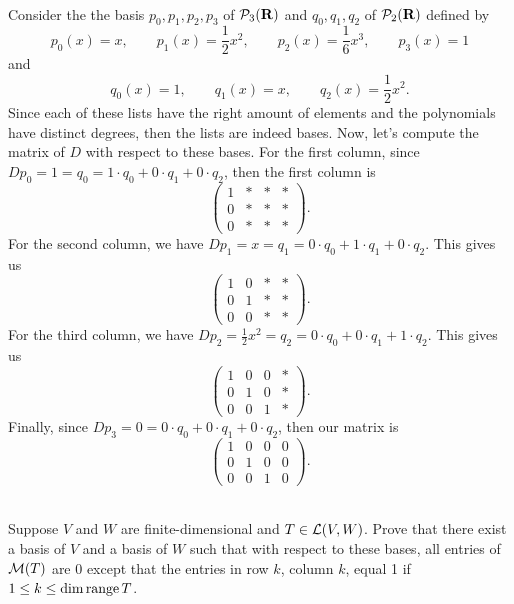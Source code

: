 \begin{solution}
    \\ Consider the the basis $p_0, p_1, p_2, p_3$ of $\mathcal{P}_3(\mathbf{R})$ and $q_0, q_1, q_2$ of $\mathcal{P}_2(\mathbf{R})$ defined by 
    $$p_0(x) = x, \qquad p_1(x) = \frac{1}{2}x^2, \qquad p_2(x) = \frac{1}{6}x^3, \qquad p_3(x) = 1$$
    and
    $$q_0(x) = 1, \qquad q_1(x) = x, \qquad q_2(x) = \frac{1}{2}x^2.$$
    Since each of these lists have the right amount of elements and the polynomials have distinct degrees, then the lists are indeed bases. Now, let's compute the matrix of $D$ with respect to these bases. For the first column, since $Dp_0 = 1 = q_0 = 1\cdot q_0 + 0 \cdot q_1 + 0\cdot q_2$, then the first column is
    $$\begin{pmatrix}
        1 & * & * & * \\ 0 & * & * & * \\ 0 & * & * & * 
    \end{pmatrix}.$$
    For the second column, we have $Dp_1 = x = q_1 = 0\cdot q_0 + 1 \cdot q_1 + 0\cdot q_2$. This gives us
    $$\begin{pmatrix}
        1 & 0 & * & * \\ 0 & 1 & * & * \\ 0 & 0 & * & * 
    \end{pmatrix}.$$
    For the third column, we have $Dp_2 = \frac{1}{2}x^2 = q_2 = 0\cdot q_0 + 0 \cdot q_1 + 1\cdot q_2$. This gives us
    $$\begin{pmatrix}
        1 & 0 & 0 & * \\ 0 & 1 & 0 & * \\ 0 & 0 & 1 & * 
    \end{pmatrix}.$$
    Finally, since $Dp_3 = 0 =  0\cdot q_0 + 0 \cdot q_1 + 0\cdot q_2$, then our matrix is 
    $$\begin{pmatrix}
        1 & 0 & 0 & 0 \\ 0 & 1 & 0 & 0 \\ 0 & 0 & 1 & 0 
    \end{pmatrix}.$$\\
\end{solution}

\begin{exercise}
    Suppose $V$ and $W$ are finite-dimensional and $T \in \mathcal{L}(V,W)$. Prove that there exist a basis of $V$ and a basis of $W$ such that with respect to these bases, all entries of $\operatorname{\mathcal{M}}(T)$ are 0 except that the entries in row $k$, column $k$, equal 1 if $1 \leq k \leq \dim \operatorname{\text{range}} T$. \\
\end{exercise}

